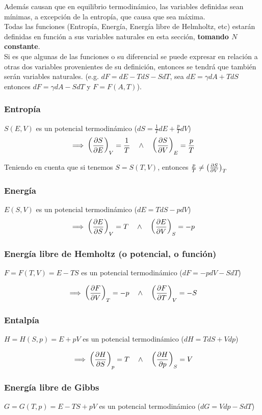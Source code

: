 Además causan que en equilibrio termodinámico, las variables definidas sean mínimas, a excepción de la entropía, que causa que sea máxima.\\

Todas las funciones (Entropía, Energía, Energía libre de Helmholtz, etc) estarán definidas en función a sus variables naturales en esta sección, \textbf{tomando $N$ constante}.\\

Si es que algunas de las funciones o su diferencial se puede expresar en relación a otras dos variables provenientes de su definición, entonces se tendrá que también serán variables naturales. (e.g. $dF = dE - TdS - SdT$, sea $dE = \gamma dA + TdS$ entonces $dF = \gamma dA - SdT$ y $F = F(A,T)$).

\subsubsection{Entropía} $S(E, V)$ es un potencial termodinámico ($dS = \frac{1}{T}dE + \frac{p}{T}dV$)
\[\implies \devtermo{V}{S}{E} = \frac{1}{T}\quad 
\land \quad \devtermo{E}{S}{V} = \frac{p}{T}\]

Teniendo en cuenta que si tenemos $S = S(T, V)$, entonces $\frac{p}{T} \neq \devtermo{T}{S}{V}$

\subsubsection{Energía} $E(S,V)$ es un potencial termodinámico ($dE = TdS - pdV$)
\[\implies \devtermo{V}{E}{S} = T \quad \land \quad \devtermo{S}{E}{V} = -p\]

\subsubsection{Energía libre de Hemholtz (o potencial, o función)} 
$F = F(T,V)=E-TS$ es un potencial termodinámico ($dF = -pdV - SdT$)

\[\implies \devtermo{T}{F}{V} = -p \quad \land \quad \devtermo{V}{F}{T} = -S\]

\subsubsection{Entalpía}
$H =H(S,p)=E+pV$ es un potencial termodinámico ($dH = TdS + Vdp$)

\[\implies \devtermo{p}{H}{S} = T \quad \land \quad \devtermo{S}{H}{p} = V\]

\subsubsection{Energía libre de Gibbs}
$G = G(T,p) = E - TS + pV$ es un potencial termodinámico ($dG = Vdp - SdT$)

